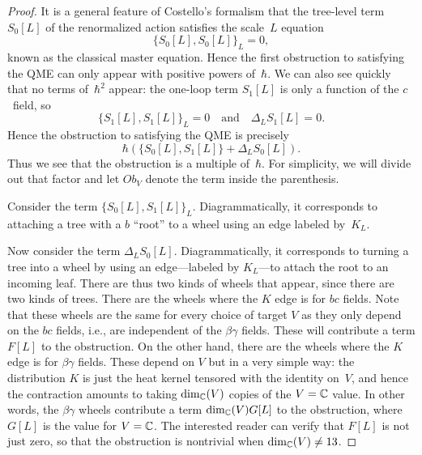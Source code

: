 \begin{proof}
It is a general feature of Costello's formalism that the tree-level term $S_0[L]$ of the renormalized action satisfies the scale~$L$ equation
\[
\{S_0[L],S_0[L]\}_L = 0,
\]
known as the classical master equation.
Hence the first obstruction to satisfying the QME can only appear with positive powers of~$\hbar$.
We can also see quickly that no terms of~$\hbar^2$ appear:
the one-loop term $S_1[L]$ is only a function of the $c$~field, 
so 
\[
\{S_1[L],S_1[L]\}_L = 0 \quad\text{and}\quad \Delta_L S_1[L] = 0.
\]
Hence the obstruction to satisfying the QME is precisely
\[
\hbar\left( \{S_0[L],S_1[L]\} + \Delta_L S_0[L] \right).
\]
Thus we see that the obstruction is a multiple of~$\hbar$.
For simplicity, we will divide out that factor and let $Ob_V$ denote the term inside the parenthesis.

Consider the term $\{S_0[L],S_1[L]\}_L$. 
Diagrammatically, it corresponds to attaching a tree with a $b$ ``root'' to a wheel using an edge labeled by~$K_L$.

Now consider the term $\Delta_L S_0[L]$. 
Diagrammatically, it corresponds to turning a tree into a wheel by using an edge---labeled by $K_L$---to attach the root to an incoming leaf.
There are thus two kinds of wheels that appear, since there are two kinds of trees.
There are the wheels where the $K$ edge is for $bc$ fields.
Note that these wheels are the same for every choice of target $V$
as they only depend on the $bc$ fields, i.e., are independent of the $\beta\gamma$ fields.
These will contribute a term $F[L]$ to the obstruction.
On the other hand, there are the wheels where the $K$ edge is for $\beta\gamma$ fields.
These depend on $V$ but in a very simple way: 
the distribution $K$ is just the heat kernel tensored with the identity on~$V$, 
and hence the contraction amounts to taking $\dim_\mathbb C(V)$ copies of the $V = \mathbb C$ value.
In other words, the $\beta\gamma$ wheels contribute a term $\dim_\mathbb C(V) G[L]$ to the obstruction,
where $G[L]$ is the value for $V = \mathbb C$.
The interested reader can verify that $F[L]$ is not just zero, 
so that the obstruction is nontrivial when $\dim_\mathbb C(V) \neq 13$.
\end{proof}


